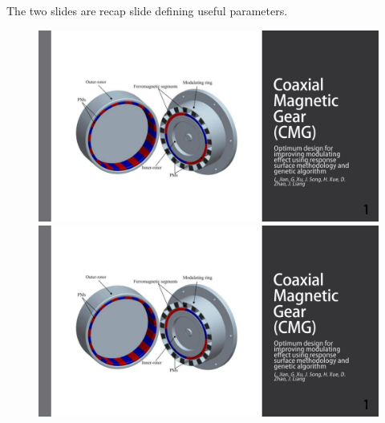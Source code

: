   The two slides are recap slide defining useful parameters. 
\begin{figure}[H]
    \begin{minipage}{.45\linewidth}
       \includegraphics[page={27},width=\textwidth]{LELEC2311.allow.pdf}
    \end{minipage}
    \hfill%
    \begin{minipage}[c]{.45\linewidth}
        \centering
        \includegraphics[page={28},width=\textwidth]{LELEC2311.allow.pdf}
    \end{minipage}
\end{figure}

